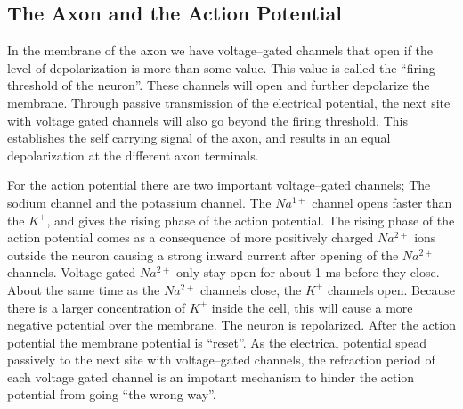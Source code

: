 \subsection{The Axon and the Action Potential}
\label{ssecTheActionPotential}
In the membrane of the axon we have voltage--gated channels that open if the level of depolarization is more than some value. This value is called the ``firing threshold of the neuron''.
These channels will open and further depolarize the membrane. Through passive transmission of the electrical potential, the next site with voltage gated channels will also go beyond the firing threshold.
This establishes the self carrying signal of the axon, and results in an equal depolarization at the different axon terminals\cite{PrinciplesOfNeuralScience4edKAP09}.
%

For the action potential there are two important voltage--gated channels; The sodium channel and the potassium channel.
The $Na^{1+}$ channel opens faster than the $K^+$, and gives the rising phase of the action potential.
The rising phase of the action potential comes as a consequence of more positively charged $Na^{2+}$ ions outside the neuron causing a strong inward current after opening of the $Na^{2+}$ channels.
Voltage gated $Na^{2+}$ only stay open for about 1 ms before they close.
About the same time as the $Na^{2+}$ channels close, the $K^+$ channels open. 
Because there is a larger concentration of $K^+$ inside the cell, this will cause a more negative potential over the membrane. The neuron is repolarized.
After the action potential the membrane potential is ``reset''\cite{NeuroscienceExploringTheBrain3edKAP4}.
As the electrical potential spead passively to the next site with voltage--gated channels, the refraction period of each voltage gated channel is an impotant mechanism to hinder the action potential from going ``the wrong way''.

